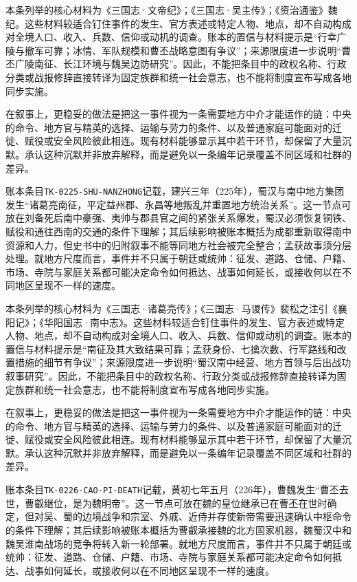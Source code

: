 本条列举的核心材料为《三国志·文帝纪》；《三国志·吴主传》；《资治通鉴》魏纪。这些材料较适合钉住事件的发生、官方表述或特定人物、地点，却不自动构成对全境人口、收入、兵数、信仰或动机的调查。账本的置信与材料提示是“行幸广陵与撤军可靠；冰情、军队规模和曹丕战略意图有争议”；来源限度进一步说明“曹丕广陵南征、长江环境与魏吴边防研究”。因此，不能把条目中的政权名称、行政分类或战报修辞直接转译为固定族群和统一社会意志，也不能将制度宣布写成各地同步实施。

在叙事上，更稳妥的做法是把这一事件视为一条需要地方中介才能运作的链：中央的命令、地方官与精英的选择、运输与劳力的条件、以及普通家庭可能面对的迁徙、赋役或安全风险彼此相连。现有材料能够显示其中若干环节，却保留了大量沉默。承认这种沉默并非放弃解释，而是避免以一条编年记录覆盖不同区域和社群的差异。

账本条目\texttt{TK-0225-SHU-NANZHONG}记载，建兴三年（225年），蜀汉与南中地方集团发生“诸葛亮南征，平定益州郡、永昌等地叛乱并重置地方统治关系”。这一节点可放在刘备死后南中豪强、夷帅与郡县官之间的紧张关系爆发，蜀汉必须恢复铜铁、赋役和通往西南的交通的条件下理解；其后续影响被账本概括为成都重新取得南中资源和人力，但史书中的归附叙事不能等同地方社会被完全整合；孟获故事须分层处理。就地方尺度而言，事件并不只属于朝廷或统帅：征发、道路、仓储、户籍、市场、寺院与家庭关系都可能决定命令如何抵达、战事如何延长，或接收何以在不同地区呈现不一样的速度。

本条列举的核心材料为《三国志·诸葛亮传》；《三国志·马谡传》裴松之注引《襄阳记》；《华阳国志·南中志》。这些材料较适合钉住事件的发生、官方表述或特定人物、地点，却不自动构成对全境人口、收入、兵数、信仰或动机的调查。账本的置信与材料提示是“南征及其大致结果可靠；孟获身份、七擒次数、行军路线和改置措施的细节有争议”；来源限度进一步说明“蜀汉南中经营、地方首领与后出战功叙事研究”。因此，不能把条目中的政权名称、行政分类或战报修辞直接转译为固定族群和统一社会意志，也不能将制度宣布写成各地同步实施。

在叙事上，更稳妥的做法是把这一事件视为一条需要地方中介才能运作的链：中央的命令、地方官与精英的选择、运输与劳力的条件、以及普通家庭可能面对的迁徙、赋役或安全风险彼此相连。现有材料能够显示其中若干环节，却保留了大量沉默。承认这种沉默并非放弃解释，而是避免以一条编年记录覆盖不同区域和社群的差异。

账本条目\texttt{TK-0226-CAO-PI-DEATH}记载，黄初七年五月（226年），曹魏发生“曹丕去世，曹叡继位，是为魏明帝”。这一节点可放在魏的皇位继承已在曹丕在世时确定，但对吴、蜀的边境战争和宗室、外戚、近侍并存使新帝需要迅速确认中枢命令的条件下理解；其后续影响被账本概括为曹叡承接魏的北方国家机器，魏蜀汉中和魏吴淮南战场的竞争将转入新一轮部署。就地方尺度而言，事件并不只属于朝廷或统帅：征发、道路、仓储、户籍、市场、寺院与家庭关系都可能决定命令如何抵达、战事如何延长，或接收何以在不同地区呈现不一样的速度。

